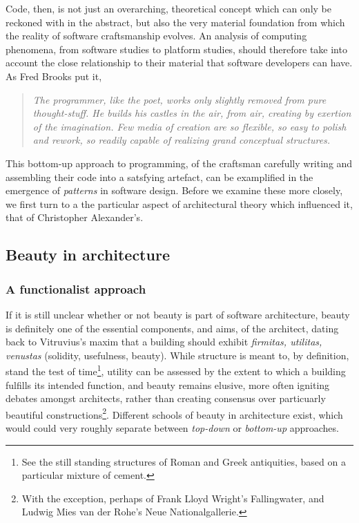 \documentclass{article}
\begin{document}
Code, then, is not just an overarching, theoretical concept which can only be reckoned with in the abstract, but also the very material foundation from which the reality of software craftsmanship evolves. An analysis of computing phenomena, from software studies to platform studies, should therefore take into account the close relationship to their material that software developers can have. As Fred Brooks put it,

\begin{quote}
    \textit{The programmer, like the poet, works only slightly removed from pure thought-stuff. He builds his castles in the air, from air, creating by exertion of the imagination. Few media of creation are so flexible, so easy to polish and rework, so readily capable of realizing grand conceptual structures.\cite{brooks_mythical_1975}}
\end{quote}

This bottom-up approach to programming, of the craftsman carefully writing and assembling their code into a satsfying artefact, can be examplified in the emergence of \emph{patterns} in software design. Before we examine these more closely, we first turn to a the particular aspect of architectural theory which influenced it, that of Christopher Alexander's.

\vspace{1\baselineskip}

\subsection{Beauty in architecture}

\subsubsection{A functionalist approach}

If it is still unclear whether or not beauty is part of software architecture, beauty is definitely one of the essential components, and aims, of the architect, dating back to Vitruvius's maxim that a building should exhibit \emph{firmitas, utilitas, venustas} (solidity, usefulness, beauty). While structure is meant to, by definition, stand the test of time\footnote{See the still standing structures of Roman and Greek antiquities, based on a particular mixture of cement.}, utility can be assessed by the extent to which a building fulfills its intended function, and beauty remains elusive, more often igniting debates amongst architects, rather than creating consensus over particuarly beautiful constructions\footnote{With the exception, perhaps of Frank Lloyd Wright's Fallingwater, and Ludwig Mies van der Rohe's Neue Nationalgallerie.}. Different schools of beauty in architecture exist, which would could very roughly separate between \emph{top-down} or \emph{bottom-up} approaches.
\end{document}
